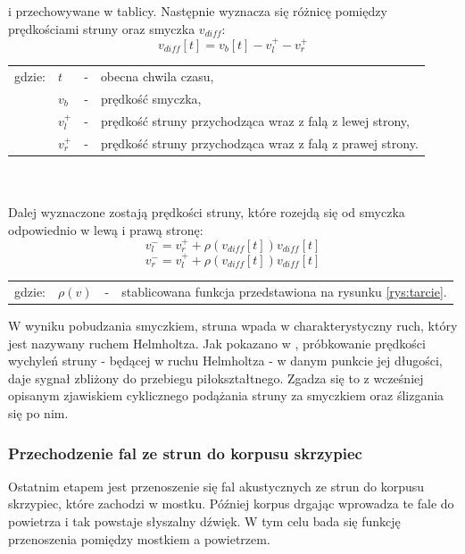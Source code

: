 i przechowywane w tablicy. Następnie wyznacza się różnicę pomiędzy prędkościami struny oraz smyczka $v_{diff}$:
\begin{equation} \label{equ:wzor1}
v_{diff}[t] = v_b[t] - v_{l}^{+} - v_{r}^{+}
\end{equation}
\begin{tabular}{ l l l l}
	gdzie: & $t$ &  - & obecna chwila czasu, \\
	&	$v_b$ & - &  prędkość smyczka, \\
	&	$v_{l}^{+}$ & - & prędkość struny przychodząca wraz z falą z lewej strony,\\
	&	$v_{r}^{+}$ & - &  prędkość struny przychodząca wraz z falą z prawej strony.\\
\end{tabular} \\ \\
Dalej wyznaczone zostają prędkości struny, które rozejdą się od smyczka odpowiednio w lewą i prawą stronę:
\begin{equation} \label{equ:wzor2}
v_{l}^{-} = v_r^{+} +  \rho(v_{diff}[t])v_{diff}[t]
\end{equation}
\begin{equation} \label{equ:wzor3}
v_{r}^{-} = v_l^{+} +  \rho(v_{diff}[t])v_{diff}[t]
\end{equation}
\begin{tabular}{ l l l l}
	gdzie: & $\rho(v)$ &  - & stablicowana funkcja przedstawiona na rysunku \ref{rys:tarcie}. \\
	
\end{tabular}
\vspace{6pt}

W wyniku pobudzania smyczkiem, struna wpada w charakterystyczny ruch, który jest nazywany ruchem Helmholtza. Jak pokazano w \cite{bowed_2}, próbkowanie prędkości wychyleń struny - będącej w ruchu Helmholtza - w danym punkcie jej długości, daje sygnał zbliżony do przebiegu piłokształtnego. Zgadza się to z wcześniej opisanym zjawiskiem cyklicznego podążania struny za smyczkiem oraz ślizgania się po nim.

\subsubsection{Przechodzenie fal ze strun do korpusu skrzypiec}\label{sec:model_violinarma}

Ostatnim etapem jest przenoszenie się fal akustycznych ze strun do korpusu skrzypiec, które zachodzi w mostku. Później korpus drgając wprowadza te fale do powietrza i tak powstaje słyszalny dźwięk. W tym celu bada się funkcję przenoszenia pomiędzy mostkiem a powietrzem. 

